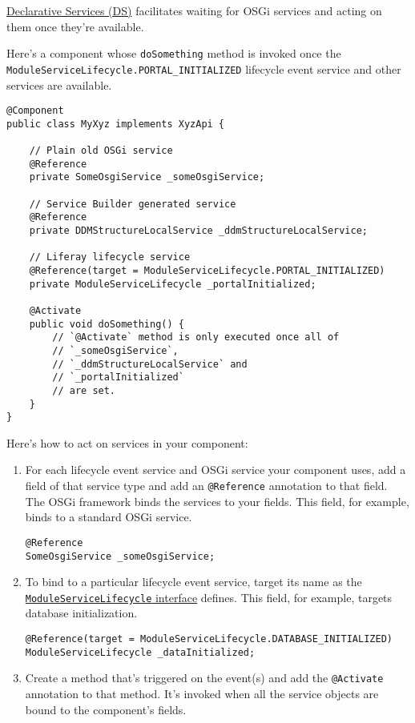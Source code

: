 \href{https://osgi.org/specification/osgi.cmpn/7.0.0/service.component.html}{Declarative
Services (DS)} facilitates waiting for OSGi services and acting on them
once they're available.

Here's a component whose \texttt{doSomething} method is invoked once the
\texttt{ModuleServiceLifecycle.PORTAL\_INITIALIZED} lifecycle event
service and other services are available.

\begin{verbatim}
@Component
public class MyXyz implements XyzApi {

    // Plain old OSGi service
    @Reference
    private SomeOsgiService _someOsgiService;

    // Service Builder generated service
    @Reference
    private DDMStructureLocalService _ddmStructureLocalService;

    // Liferay lifecycle service
    @Reference(target = ModuleServiceLifecycle.PORTAL_INITIALIZED)
    private ModuleServiceLifecycle _portalInitialized;

    @Activate
    public void doSomething() {
        // `@Activate` method is only executed once all of
        // `_someOsgiService`,
        // `_ddmStructureLocalService` and
        // `_portalInitialized`
        // are set.
    }
}
\end{verbatim}

Here's how to act on services in your component:

\begin{enumerate}
\def\labelenumi{\arabic{enumi}.}
\item
  For each lifecycle event service and OSGi service your component uses,
  add a field of that service type and add an \texttt{@Reference}
  annotation to that field. The OSGi framework binds the services to
  your fields. This field, for example, binds to a standard OSGi
  service.

\begin{verbatim}
@Reference
SomeOsgiService _someOsgiService;
\end{verbatim}
\item
  To bind to a particular lifecycle event service, target its name as
  the
  \href{https://docs.liferay.com/dxp/portal/7.2-latest/javadocs/portal-kernel/com/liferay/portal/kernel/module/framework/ModuleServiceLifecycle.html}{\texttt{ModuleServiceLifecycle}
  interface} defines. This field, for example, targets database
  initialization.

\begin{verbatim}
@Reference(target = ModuleServiceLifecycle.DATABASE_INITIALIZED)
ModuleServiceLifecycle _dataInitialized;
\end{verbatim}
\item
  Create a method that's triggered on the event(s) and add the
  \texttt{@Activate} annotation to that method. It's invoked when all
  the service objects are bound to the component's fields.
\end{enumerate}

